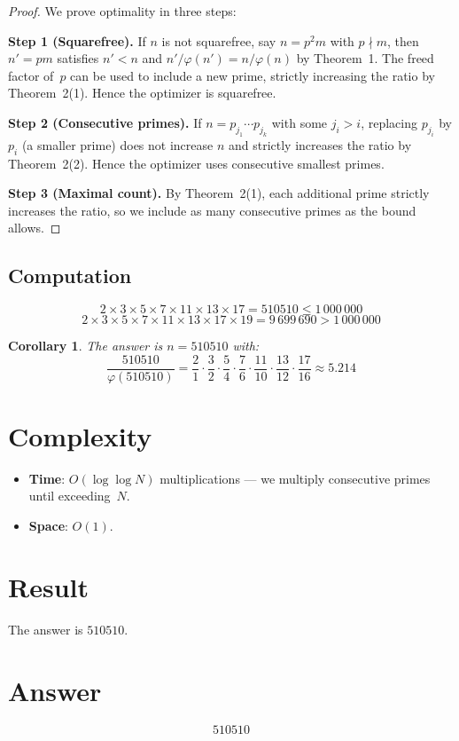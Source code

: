\documentclass[12pt,a4paper]{article}
\newtheorem{corollary}[theorem]{Corollary}
\begin{document}
\begin{proof}
We prove optimality in three steps:

\textbf{Step 1 (Squarefree).} If $n$ is not squarefree, say $n = p^2 m$ with $p \nmid m$, then $n' = pm$ satisfies $n' < n$ and $n'/\varphi(n') = n/\varphi(n)$ by Theorem~1. The freed factor of~$p$ can be used to include a new prime, strictly increasing the ratio by Theorem~2(1). Hence the optimizer is squarefree.

\textbf{Step 2 (Consecutive primes).} If $n = p_{j_1} \cdots p_{j_k}$ with some $j_i > i$, replacing $p_{j_i}$ by $p_i$ (a smaller prime) does not increase $n$ and strictly increases the ratio by Theorem~2(2). Hence the optimizer uses consecutive smallest primes.

\textbf{Step 3 (Maximal count).} By Theorem~2(1), each additional prime strictly increases the ratio, so we include as many consecutive primes as the bound allows.
\end{proof}

\subsection{Computation}

\[
2 \times 3 \times 5 \times 7 \times 11 \times 13 \times 17 = 510510 \le 1\,000\,000
\]
\[
2 \times 3 \times 5 \times 7 \times 11 \times 13 \times 17 \times 19 = 9\,699\,690 > 1\,000\,000
\]

\begin{corollary}
The answer is $n = 510510$ with:
\[
\frac{510510}{\varphi(510510)} = \frac{2}{1} \cdot \frac{3}{2} \cdot \frac{5}{4} \cdot \frac{7}{6} \cdot \frac{11}{10} \cdot \frac{13}{12} \cdot \frac{17}{16} \approx 5.214
\]
\end{corollary}

\section{Complexity}

\begin{itemize}
    \item \textbf{Time}: $O(\log \log N)$ multiplications --- we multiply consecutive primes until exceeding~$N$.
    \item \textbf{Space}: $O(1)$.
\end{itemize}

\section{Result}

The answer is $\boxed{510510}$.

\section{Answer}

\[
\boxed{510510}
\]
\end{document}
